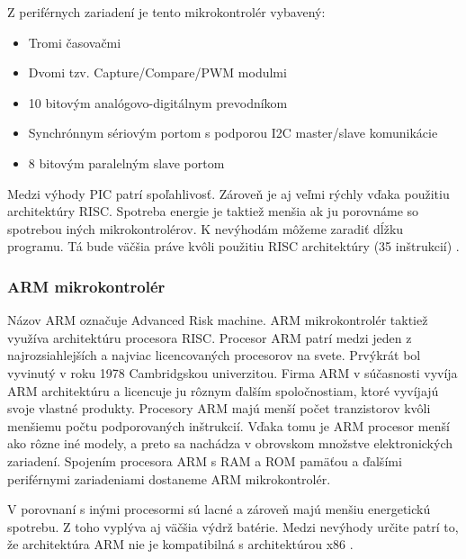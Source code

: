 Z periférnych zariadení je tento mikrokontrolér vybavený:
\begin{itemize}
    \item Tromi časovačmi
    \item Dvomi tzv. Capture/Compare/PWM modulmi
    \item 10 bitovým analógovo-digitálnym prevodníkom
    \item Synchrónnym sériovým portom s podporou I2C master/slave komunikácie
    \item 8 bitovým paralelným slave portom
\end{itemize}

Medzi výhody PIC patrí spoľahlivosť. Zároveň je aj veľmi rýchly vďaka použitiu architektúry RISC.
Spotreba energie je taktiež menšia ak ju porovnáme so spotrebou iných mikrokontrolérov. K nevýhodám môžeme zaradiť dĺžku programu.
Tá bude väčšia práve kvôli použitiu RISC architektúry (35 inštrukcií) \cite{shidlingDifferentTypesMicrocontrollers2020}.

\subsubsection{ARM mikrokontrolér}
\noindent
Názov ARM označuje Advanced Risk machine. ARM mikrokontrolér taktiež využíva architektúru procesora RISC. Procesor ARM patrí medzi jeden z najrozsiahlejších
a najviac licencovaných procesorov na svete. Prvýkrát bol vyvinutý v roku 1978 Cambridgskou univerzitou. Firma ARM v súčasnosti vyvíja ARM architektúru a
licencuje ju rôznym ďalším spoločnostiam, ktoré vyvíjajú svoje vlastné produkty.
Procesory ARM majú menší počet tranzistorov kvôli menšiemu počtu podporovaných inštrukcií. Vďaka tomu je ARM procesor menší ako rôzne iné modely, a preto sa nachádza v obrovskom množstve elektronických zariadení. Spojením procesora ARM
s RAM a ROM pamäťou a ďalšími periférnymi zariadeniami dostaneme ARM mikrokontrolér.\par

V porovnaní s inými procesormi sú lacné a zároveň majú menšiu energetickú spotrebu. Z toho vyplýva aj väčšia výdrž batérie.
Medzi nevýhody určite patrí to, že architektúra ARM nie je kompatibilná s architektúrou x86 \cite{shidlingDifferentTypesMicrocontrollers2020}.

